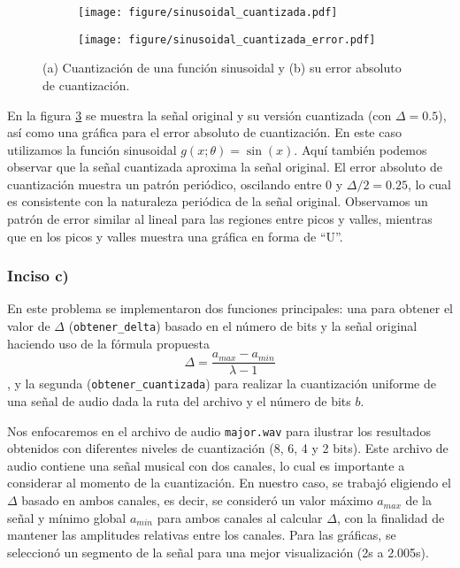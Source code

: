 \documentclass[paper=letter, fontsize=11pt, draft=false]{scrartcl}
\numberwithin{equation}{problemcounter} %
\numberwithin{figure}{problemcounter} %
\numberwithin{table}{problemcounter} %
\numberwithin{subsection}{problemcounter}
\begin{document}
\begin{figure}
    \centering
    \begin{subfigure}[b]{0.8\linewidth}
        \centering
        \texttt{[image: figure/sinusoidal\_cuantizada.pdf]}
        \caption{}
        \label{fig:sinusoidal_a}
    \end{subfigure}
    \vspace{0.5cm}
    \begin{subfigure}[b]{0.8\linewidth}
        \centering
        \texttt{[image: figure/sinusoidal\_cuantizada\_error.pdf]}
        \caption{}
        \label{fig:sinusoidal_b}
    \end{subfigure}
    \caption{(a) Cuantización de una función sinusoidal y (b) su error absoluto de cuantización.}
    \label{fig:sinusoidal}
\end{figure}


En la figura \ref{fig:sinusoidal} se muestra la señal original y su versión cuantizada (con $\Delta = 0.5$), así como una gráfica para el error absoluto de cuantización. En este caso utilizamos la función sinusoidal $g(x; \theta) = \sin(x)$. Aquí también podemos observar que la señal cuantizada aproxima la señal original. El error absoluto de cuantización muestra un patrón periódico, oscilando entre 0 y $\Delta/2 = 0.25$, lo cual es consistente con la naturaleza periódica de la señal original. Observamos un patrón de error similar al lineal para las regiones entre picos y valles, mientras que en los picos y valles muestra una gráfica en forma de ``U''.





\subsubsection{Inciso c)}
En este problema se implementaron dos funciones principales: una para obtener el valor de $\Delta$ (\texttt{obtener\_delta}) basado en el número de bits y la señal original haciendo uso de la fórmula propuesta $$\Delta = \frac{a_{max}-a_{min}}{\lambda-1}$$, y la segunda (\texttt{obtener\_cuantizada}) para realizar la cuantización uniforme de una señal de audio dada la ruta del archivo y el número de bits $b$.

Nos enfocaremos en el archivo de audio \texttt{major.wav} para ilustrar los resultados obtenidos con diferentes niveles de cuantización (8, 6, 4 y 2 bits). Este archivo de audio contiene una señal musical con dos canales, lo cual es importante a considerar al momento de la cuantización. En nuestro caso, se trabajó eligiendo el $\Delta$ basado en ambos canales, es decir, se consideró un valor máximo $a_{max}$ de la señal y mínimo global $a_{min}$ para ambos canales al calcular $\Delta$, con la finalidad de mantener las amplitudes relativas entre los canales. Para las gráficas, se seleccionó un segmento de la señal para una mejor visualización (2s a 2.005s).
\end{document}
